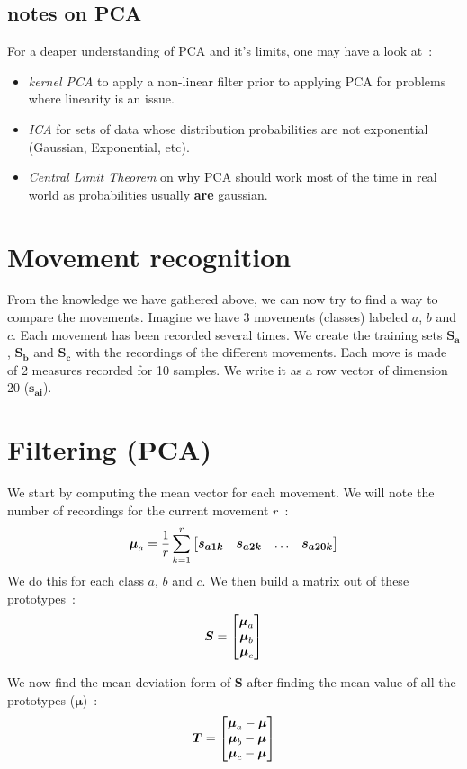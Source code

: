 \documentclass[11pt,twocolumn]{amsart} %
\newcommand{\ve}[1]{\boldsymbol{#1}}
\newcommand{\ma}[1]{\boldsymbol{#1}}
\newenvironment{m}{\begin{bmatrix}}{\end{bmatrix}}
\begin{document}
\subsection{notes on PCA}

For a deaper understanding of PCA and it's limits, one may have a look at~:
\begin{itemize}
  \item \emph{kernel PCA} to apply a non-linear filter prior to applying PCA for problems where linearity is an issue.
  \item \emph{ICA} for sets of data whose distribution probabilities are not exponential (Gaussian, Exponential, etc).
  \item \emph{Central Limit Theorem} on why PCA should work most of the time in real world as probabilities usually \textbf{are} gaussian.
\end{itemize}


\section{Movement recognition}

From the knowledge we have gathered above, we can now try to find a way to compare the movements. Imagine we have 3 movements (classes) labeled $a$, $b$ and $c$. Each movement has been recorded several times. We create the training sets $\ma{S_a}$, $\ma{S_b}$ and $\ma{S_c}$ with the recordings of the different movements. Each move is made of 2 measures recorded for 10 samples. We write it as a row vector of dimension 20 ($\ve{s_{ai}}$).


\section{Filtering (PCA)}

We start by computing the mean vector for each movement. We will note the number of recordings for the current movement $r$~:
\[
  \ve\mu_a = \frac{1}{r}\sum_{k=1}^r \begin{m}\ve{s_{a1k}} & \ve{s_{a2k}} & \hdots & \ve{s_{a20k}} \end{m}
\]
We do this for each class $a$, $b$ and $c$. We then build a matrix out of these prototypes~:
\[
  \ma{S} = \begin{m}\ve\mu_a \\ \ve\mu_b \\ \ve\mu_c \end{m}
\]

We now find the mean deviation form of $\ma{S}$ after finding the mean value of all the prototypes ($\ve\mu$)~:
\[
  \ma{T} = \begin{m}\ve\mu_a - \ve\mu \\ \ve\mu_b - \ve\mu \\ \ve\mu_c - \ve\mu \end{m}
\]
\end{document}
